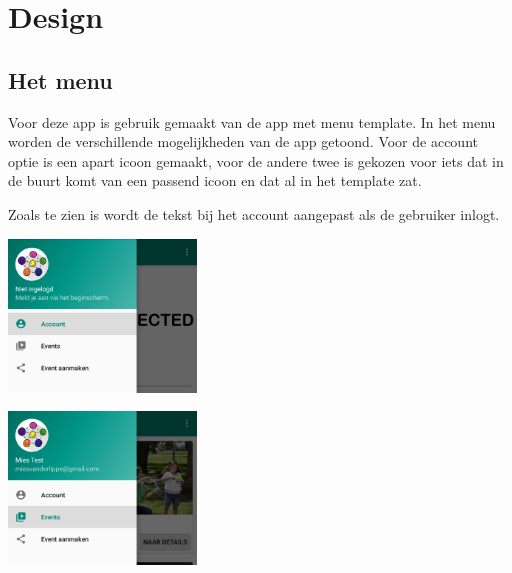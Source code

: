 \documentclass[dutch]{report}
\begin{document}
		
	\newpage
	
	\section{Design}
	
	
	\subsection{Het menu}
	Voor deze app is gebruik gemaakt van de app met menu template. In het menu worden de verschillende 
	mogelijkheden van de app getoond. Voor de account optie is een apart icoon gemaakt, voor de andere
	twee is gekozen voor iets dat in de buurt komt van een passend icoon en dat al in het template zat. 
	
	Zoals te zien is wordt de tekst bij het account aangepast als de gebruiker inlogt. 
	
	\begin{minipage}{0.50\textwidth}
		\begin{center}
			\includegraphics[width=5cm]{images/nietingelogd.png}		
		\end{center}
	\end{minipage}
	\hfill
	\begin{minipage}{0.50\textwidth}
		\begin{center}
			\includegraphics[width=5cm]{images/ingelogd.png}
		\end{center}
	\end{minipage}
	
\end{document}
